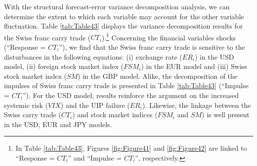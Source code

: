\documentclass[a4paper, twoside]{templates/ociamthesis}
\begin{document}
With the structural forecast-error variance decomposition analysis, we can determine the extent to which each variable may account for the other variable fluctuation. Table \ref{tab:Table43} displays the variance decomposition results for the Swiss franc carry trade (\(CT_i\)).\footnote{In Table \ref{tab:Table43}, Figures \ref{fig:Figure41} and \ref{fig:Figure42} are linked to ``Response = \(CT_i\)'' and ``Impulse = \(CT_i\)'', respectively.} Concerning the financial variables shocks (``Response = \(CT_i\)''), we find that the Swiss franc carry trade is sensitive to the disturbances in the following equations: (i) exchange rate (\(ER_i\)) in the USD model, (ii) foreign stock market index (\(FSM_i\)) in the EUR model and (iii) Swiss stock market index (\(SM\)) in the GBP model. Alike, the decomposition of the impulses of Swiss franc carry trade is presented in Table \ref{tab:Table43} (``Impulse = \(CT_i\)''). For the USD model, results reinforce the argument on the increased systemic risk (\(VIX\)) and the UIP failure (\(ER_{i}\)). Likewise, the linkage between the Swiss carry trade (\(CT_{i}\)) and stock market indices (\(FSM_{i}\) and \(SM\)) is well present in the USD, EUR and JPY models.
\end{document}
